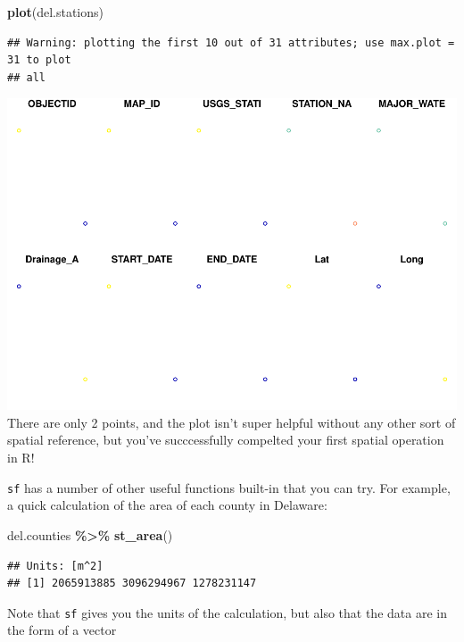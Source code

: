 \documentclass[]{article}
\newenvironment{Shaded}{\begin{snugshade}}{\end{snugshade}}
\newcommand{\FunctionTok}[1]{\textcolor[rgb]{0.13,0.29,0.53}{\textbf{#1}}}
\newcommand{\NormalTok}[1]{#1}
\newcommand{\SpecialCharTok}[1]{\textcolor[rgb]{0.81,0.36,0.00}{\textbf{#1}}}
\begin{document}
\begin{Shaded}
\begin{Highlighting}[]
\FunctionTok{plot}\NormalTok{(del.stations)}
\end{Highlighting}
\end{Shaded}

\begin{verbatim}
## Warning: plotting the first 10 out of 31 attributes; use max.plot = 31 to plot
## all
\end{verbatim}

\includegraphics{lab01_files/figure-latex/mypoints-1.pdf} There are only
2 points, and the plot isn't super helpful without any other sort of
spatial reference, but you've succcessfully compelted your first spatial
operation in R!

\texttt{sf} has a number of other useful functions built-in that you can
try. For example, a quick calculation of the area of each county in
Delaware:

\begin{Shaded}
\begin{Highlighting}[]
\NormalTok{del.counties }\SpecialCharTok{\%\textgreater{}\%} \FunctionTok{st\_area}\NormalTok{() }
\end{Highlighting}
\end{Shaded}

\begin{verbatim}
## Units: [m^2]
## [1] 2065913885 3096294967 1278231147
\end{verbatim}

Note that \texttt{sf} gives you the units of the calculation, but also
that the data are in the form of a vector
\end{document}
